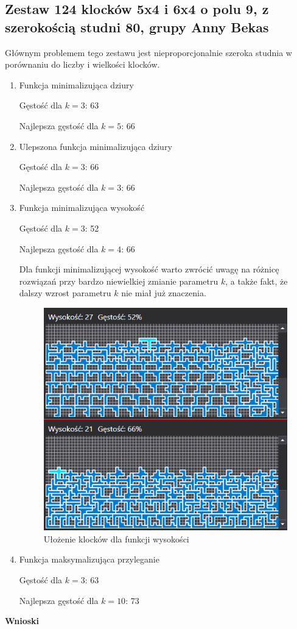 \documentclass{article}
\begin{document}
\subsection{Zestaw 124 klocków 5x4 i 6x4 o polu 9, z szerokością studni 80, grupy Anny Bekas}
Głównym problemem tego zestawu jest nieproporcjonalnie szeroka studnia w porównaniu do liczby i wielkości klocków.
\begin{enumerate}

\item Funkcja minimalizująca dziury

Gęstość dla $k=3$: 63

Najlepsza gęstość dla $k=5$: 66

\item Ulepszona funkcja minimalizująca dziury

Gęstość dla $k=3$: 66

Najlepsza gęstość dla $k=3$: 66

\item Funkcja minimalizująca wysokość

Gęstość dla $k=3$: 52

Najlepsza gęstość dla $k=4$: 66

Dla funkcji minimalizującej wysokość warto zwrócić uwagę na różnicę rozwiązań przy bardzo niewielkiej zmianie parametru $k$, a także fakt, że dalszy wzrost parametru $k$ nie miał już znaczenia.
\begin{figure}[H]
\centering
\includegraphics[width=\textwidth]{wysokosc_bekas.PNG}
\caption{Ułożenie klocków dla funkcji wysokości}
\end{figure}


\item Funkcja maksymalizująca przyleganie

Gęstość dla $k=3$: 63

Najlepsza gęstość dla $k=10$: 73

\end{enumerate}
\textbf{Wnioski}
\end{document}
